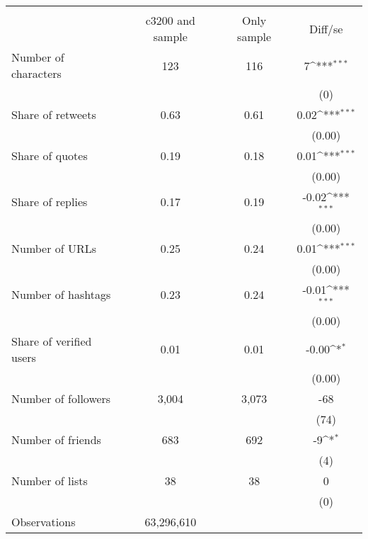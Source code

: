 {
\def\sym#1{\ifmmode^{#1}\else\(^{#1}\)\fi}
\begin{tabular}{l*{1}{ccc}}
\hline\hline
                    &\multicolumn{3}{c}{}                           \\
                    &c3200 and sample& Only sample&     Diff/se         \\
\hline
Number of characters&         123&         116&           7\sym{***}\\
                    &            &            &         (0)         \\
Share of retweets   &        0.63&        0.61&        0.02\sym{***}\\
                    &            &            &      (0.00)         \\
Share of quotes     &        0.19&        0.18&        0.01\sym{***}\\
                    &            &            &      (0.00)         \\
Share of replies    &        0.17&        0.19&       -0.02\sym{***}\\
                    &            &            &      (0.00)         \\
Number of URLs      &        0.25&        0.24&        0.01\sym{***}\\
                    &            &            &      (0.00)         \\
Number of hashtags  &        0.23&        0.24&       -0.01\sym{***}\\
                    &            &            &      (0.00)         \\
Share of verified users&        0.01&        0.01&       -0.00\sym{*}  \\
                    &            &            &      (0.00)         \\
Number of followers &       3,004&       3,073&         -68         \\
                    &            &            &        (74)         \\
Number of friends   &         683&         692&          -9\sym{*}  \\
                    &            &            &         (4)         \\
Number of lists     &          38&          38&           0         \\
                    &            &            &         (0)         \\
\hline
Observations        &  63,296,610&            &                     \\
\hline\hline
\end{tabular}
}
